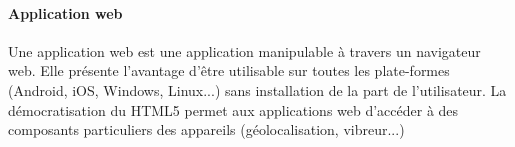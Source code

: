 \paragraph{Application web}
Une application web est une application manipulable à travers un navigateur web. Elle présente l'avantage d'être utilisable sur toutes les plate-formes (Android, iOS, Windows, Linux...) sans installation de la part de l'utilisateur. La démocratisation du HTML5 permet aux applications web d’accéder à des composants particuliers des appareils (géolocalisation, vibreur...)

